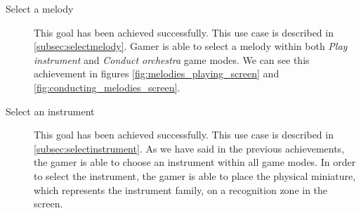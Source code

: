 \begin{description}
\item[Select a melody]
This goal has been achieved successfully. This use case is described in \ref{subsec:selectmelody}. Gamer is able to select a melody within both \textit{Play instrument} and \textit{Conduct orchestra} game modes.  We can see this achievement in figures \ref{fig:melodies_playing_screen} and \ref{fig:conducting_melodies_screen}.

\item[Select an instrument]
This goal has been achieved successfully. This use case is described in \ref{subsec:selectinstrument}. As we have said in the previous achievements, the gamer is able to choose an instrument within all game modes. In order to select the instrument, the gamer is able to place the physical miniature, which represents the instrument family, on a recognition zone in the screen.

\end{description}